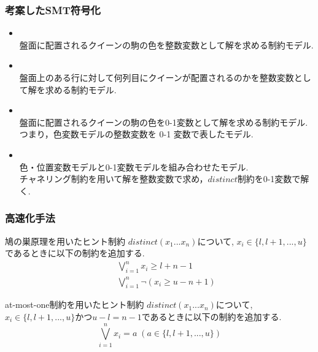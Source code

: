 \documentclass [dvipdfmx,12pt]{beamer}
\newcommand{\distinct}{$distinct$}
\begin{document}
\begin{frame}
    \frametitle{考案したSMT符号化}
    \begin{block}{}
        \begin{itemize}
            \item {}\\
                盤面に配置されるクイーンの駒の色を整数変数として解を求める制約モデル.
            \item {}\\
                盤面上のある行に対して何列目にクイーンが配置されるのかを整数変数として解を求める制約モデル.
            \item {}\\
                盤面に配置されるクイーンの駒の色を0-1変数として解を求める制約モデル.\\
                つまり，色変数モデルの整数変数を 0-1 変数で表したモデル.
            \item {}\\
                色・位置変数モデルと0-1変数モデルを組み合わせたモデル.\\
                チャネリング制約を用いて解を整数変数で求め，\distinct 制約を0-1変数で解く.
        \end{itemize}
    \end{block}
\end{frame}



\begin{frame}
    \frametitle{高速化手法}
    \vspace{-3mm}
    \begin{exampleblock}{鳩の巣原理を用いたヒント制約}
        $distinct(x_1 ... x_n)$について, $x_i \in \{l, l+1, ..., u\}$であるときに以下の制約を追加する.
        \vspace{-3mm}
        \begin{eqnarray}
            && \bigvee_{i=1}^n   x_i \geq l+n-1\\
            && \bigvee_{i=1}^n \lnot(x_i \geq u-n+1)
        \end{eqnarray}
    \end{exampleblock}
    \begin{exampleblock}{at-most-one制約を用いたヒント制約}
        $distinct(x_1 ... x_n)$について, $x_i \in \{l, l+1, ..., u\}$かつ$u-l=n-1$であるときに以下の制約を追加する.\\
        \vspace{-3mm}
        $$\bigvee_{i=1}^n x_i=a \; (a \in \{l, l+1, ..., u\})$$
    \end{exampleblock}
\end{frame}
\end{document}
